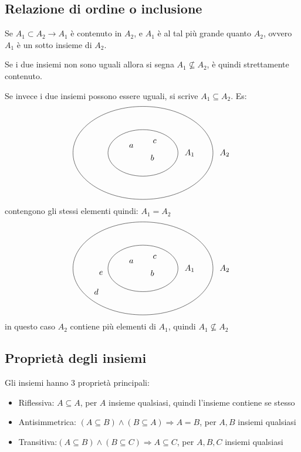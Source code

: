 \documentclass[a4paper,12pt]{article}
\begin{document}
	\subsection{Relazione di ordine o inclusione}
	Se $A_1 \subset A_2 \rightarrow A_1$ è contenuto in $A_2$, e $A_1$ è al tal più grande quanto $A_2$, ovvero $A_1$ è un sotto insieme di $A_2$.
	
	Se i due insiemi non sono uguali allora si segna $A_1 \not \subseteq A_2$, è quindi strettamente contenuto.
	
	Se invece i due insiemi possono essere uguali, si scrive $A_1 \subseteq A_2$.
	\newpage
	Es:
	\[
	\begin{tikzpicture}
		\draw (0,0) ellipse (3cm and 2cm);
		\node at (3.5,0) {$A_2$}; %
		
		\draw (0,0) ellipse (1.5cm and 1cm);
		\node at (2,0) {$A_1$}; %
		
		\node at (-0.5,0.3) {$a$};
		\node at (0.4,-0.2) {$b$};
		\node at (0.5,+0.5) {$c$};
	\end{tikzpicture}
	\] 
	contengono gli stessi elementi quindi: $A_1 = A_2$ 
	\[
	\begin{tikzpicture}
		\draw (0,0) ellipse (3cm and 2cm);
		\node at (3.5,0) {$A_2$}; %
		
		\draw (0,0) ellipse (1.5cm and 1cm);
		\node at (2,0) {$A_1$}; %
		
		\node at (-0.5,0.3) {$a$};
		\node at (0.4,-0.2) {$b$};
		\node at (0.5,+0.5) {$c$};
		\node at (-2,-1) {$d$};
		\node at (-1.8, -0.2) {$e$};
	\end{tikzpicture}
	\]
	in questo caso $A_2$ contiene più elementi di $A_1$, quindi $A_1 \not \subseteq A_2$
	
	\subsection{Proprietà degli insiemi}
	Gli insiemi hanno 3 proprietà principali:
	\begin{itemize}
		\item Riflessiva: $A \subseteq A$, per $A$ insieme qualsiasi, quindi l'insieme contiene se stesso
		\item Antisimmetrica: $(A \subseteq B) \wedge (B \subseteq A) \Rightarrow A = B$, per $A, B$ insiemi qualsiasi
		\item Transitiva:$(A \subseteq B) \wedge (B \subseteq C) \Rightarrow A \subseteq C$, per $A, B, C$ insiemi qualsiasi
	\end{itemize}
	
\end{document}
